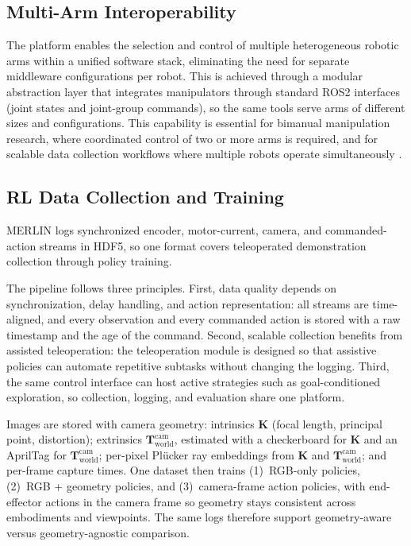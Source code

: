 \documentclass[a4paper, 10pt, conference]{ieeeconf}      %
\begin{document}
\subsection{Multi-Arm Interoperability}

The platform enables the selection and control of multiple heterogeneous robotic arms within a unified software stack, eliminating the need for separate middleware configurations per robot. This is achieved through a modular abstraction layer that integrates manipulators through standard ROS2 interfaces (joint states and joint-group commands), so the same tools serve arms of different sizes and configurations. This capability is essential for bimanual manipulation research, where coordinated control of two or more arms is required, and for scalable data collection workflows where multiple robots operate simultaneously \cite{dass2023pato, unibidex}.

\subsection{RL Data Collection and Training}
MERLIN logs synchronized encoder, motor-current, camera, and commanded-action streams in HDF5, so one format covers teleoperated demonstration collection through policy training.

The pipeline follows three principles. First, data quality depends on synchronization, delay handling, and action representation: all streams are time-aligned, and every observation and every commanded action is stored with a raw timestamp and the age of the command. Second, scalable collection benefits from assisted teleoperation: the teleoperation module is designed so that assistive policies can automate repetitive subtasks without changing the logging. Third, the same control interface can host active strategies such as goal-conditioned exploration, so collection, logging, and evaluation share one platform.

Images are stored with camera geometry: intrinsics \(\bm{K}\) (focal length, principal point, distortion); extrinsics \(\bm{T}_{\text{world}}^{\text{cam}}\), estimated with a checkerboard for \(\bm{K}\) and an AprilTag for \(\bm{T}_{\text{world}}^{\text{cam}}\); per-pixel Pl\"ucker ray embeddings from \(\bm{K}\) and \(\bm{T}_{\text{world}}^{\text{cam}}\); and per-frame capture times. One dataset then trains (1)~RGB-only policies, (2)~RGB + geometry policies, and (3)~camera-frame action policies, with end-effector actions in the camera frame so geometry stays consistent across embodiments and viewpoints. The same logs therefore support geometry-aware versus geometry-agnostic comparison.
\end{document}
